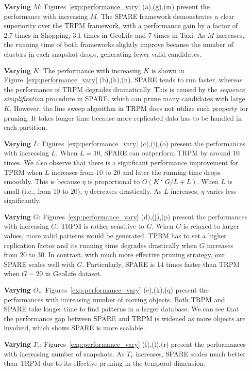 \textbf{Varying $M$}: Figures~\ref{exp:performance_vary} (a),(g),(m)
present the performance with increasing $M$. The SPARE framework demonstrates a clear superiority over the TRPM framework, with 
a performance gain by a factor of  $2.7$ times in Shopping, $3.1$ times in GeoLife and
$7$ times in Taxi. As $M$ increases, the running time of both frameworks slightly improve because the number of clusters in each snapshot drops, generating fewer valid candidates.

\textbf{Varying $K$}: The performance with increasing $K$ is shown in Figure~\ref{exp:performance_vary} (b),(h),(n).  SPARE tends to run faster, whereas the performance of TRPM degrades dramatically. This is caused by the \emph{sequence simplification} procedure in SPARE, which can prune many candidates with large $K$. However, the line sweep algorithm in TRPM does not utilize such property for pruning. It takes longer time because more replicated data has to be handled in each partition.

\textbf{Varying $L$}: Figures~\ref{exp:performance_vary} (c),(i),(o) present the performances with increasing $L$. When $L=10$, SPARE can outperform TRPM by around $10$ times. We also observe that there is a significant performance improvement for TPRM when $L$ increases from $10$ to $20$ and later the running time drops smoothly. 
This is because $\eta$ is proportional to $O(K*G/L+L)$. When $L$ is small (i.e., from $10$ to $20$),
$\eta$ decreases drastically. As $L$ increases, $\eta$ varies less significantly.

\textbf{Varying $G$}: Figures~\ref{exp:performance_vary} (d),(j),(p) present the performances with increasing $G$.  TRPM is rather sensitive to $G$. When $G$ is relaxed to larger values, more valid patterns would be generated. TPRM has to set a higher replication factor and its running time degrades drastically when $G$ increases from $20$ to $30$. In contrast, with much more effective pruning strategy, our SPARE scales well with $G$. Particularly, SPARE is 14 times faster than TRPM when $G=20$ in GeoLife dataset.

\textbf{Varying $O_r$}: Figures~\ref{exp:performance_vary} (e),(k),(q) present the performances with increasing number of moving objects. Both TRPM and SPARE take longer time to find patterns in a larger database. We can see that the performance gap between SPARE and TRPM is widened as more objects are involved, which shows SPARE is more scalable.

\textbf{Varying $T_r$}: Figures~\ref{exp:performance_vary} (f),(l),(r) present 
the performances with increasing number of snapshots. As $T_r$ increases, SPARE scales much better than TRPM due to its effective pruning in the temporal dimension. 

